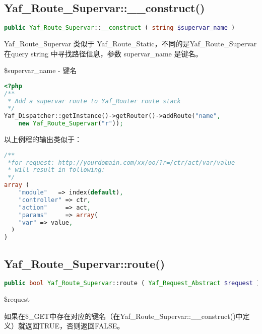 \subsection{Yaf\_Route\_Supervar::\_\_construct()}

\begin{lstlisting}[language=PHP]
public Yaf_Route_Supervar::__construct ( string $supervar_name )
\end{lstlisting}

Yaf\_Route\_Supervar 类似于 Yaf\_Route\_Static，不同的是Yaf\_Route\_Supervar 在query string 中寻找路径信息，参数 supervar\_name 是键名。

\begin{compactitem}
\item \$supervar\_name - 键名
\end{compactitem}



\begin{lstlisting}[language=PHP]
<?php
/**
 * Add a supervar route to Yaf_Router route stack
 */
Yaf_Dispatcher::getInstance()->getRouter()->addRoute("name",
    new Yaf_Route_Supervar("r"));
\end{lstlisting}

以上例程的输出类似于：

\begin{lstlisting}[language=PHP]
/** 
 *for request: http://yourdomain.com/xx/oo/?r=/ctr/act/var/value
 * will result in following:
 */
array (
    "module"   => index(default),
    "controller" => ctr,
    "action"     => act,
    "params"     => array(
    "var" => value,
  )
)
\end{lstlisting}


\subsection{Yaf\_Route\_Supervar::route()}




\begin{lstlisting}[language=PHP]
public bool Yaf_Route_Supervar::route ( Yaf_Request_Abstract $request )
\end{lstlisting}

\begin{compactitem}
\item \$request
\end{compactitem}

如果在\$\_GET中存在对应的键名（在Yaf\_Route\_Supervar::\_\_construct()中定义）就返回TRUE，否则返回FALSE。

